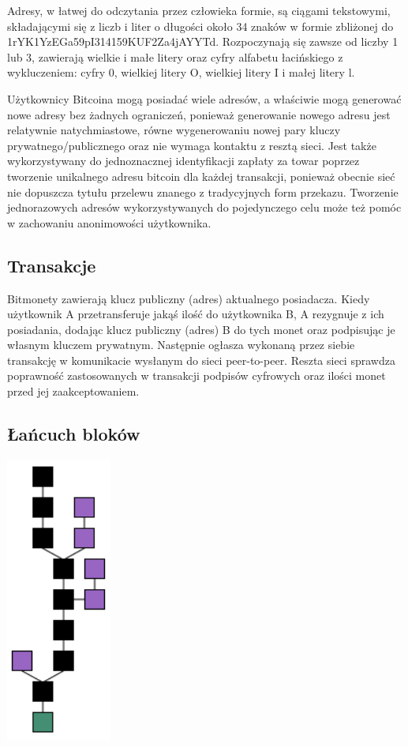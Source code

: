 \documentclass[11pt,a4paper]{article}
\begin{document}
Adresy, w łatwej do odczytania przez człowieka formie, są ciągami tekstowymi, składającymi się z liczb i liter o długości około 34 znaków w formie zbliżonej do 1rYK1YzEGa59pI314159KUF2Za4jAYYTd. Rozpoczynają się zawsze od liczby 1 lub 3, zawierają wielkie i małe litery oraz cyfry alfabetu łacińskiego z wykluczeniem: cyfry 0, wielkiej litery O, wielkiej litery I i małej litery l.

Użytkownicy Bitcoina mogą posiadać wiele adresów, a właściwie mogą generować nowe adresy bez żadnych ograniczeń, ponieważ generowanie nowego adresu jest relatywnie natychmiastowe, równe wygenerowaniu nowej pary kluczy prywatnego/publicznego oraz nie wymaga kontaktu z resztą sieci. Jest także wykorzystywany do jednoznacznej identyfikacji zapłaty za towar poprzez tworzenie unikalnego adresu bitcoin dla każdej transakcji, ponieważ obecnie sieć nie dopuszcza tytułu przelewu znanego z tradycyjnych form przekazu. Tworzenie jednorazowych adresów wykorzystywanych do pojedynczego celu może też pomóc w zachowaniu anonimowości użytkownika.

\subsection{Transakcje}

Bitmonety zawierają klucz publiczny (adres) aktualnego posiadacza. Kiedy użytkownik A przetransferuje jakąś ilość do użytkownika B, A rezygnuje z ich posiadania, dodając klucz publiczny (adres) B do tych monet oraz podpisując je własnym kluczem prywatnym. Następnie ogłasza wykonaną przez siebie transakcję w komunikacie wysłanym do sieci peer-to-peer. Reszta sieci sprawdza poprawność zastosowanych w transakcji podpisów cyfrowych oraz ilości monet przed jej zaakceptowaniem.

\subsection{Łańcuch bloków}

\includegraphics{images/block_chains.PNG}
\end{document}
